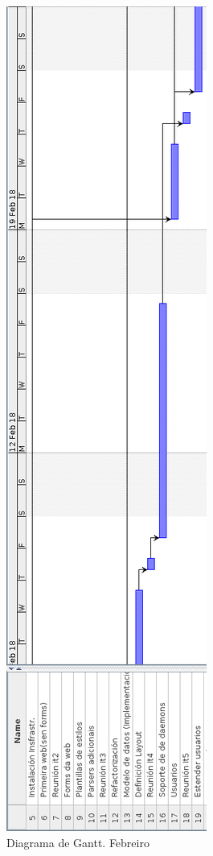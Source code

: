 \begin{figure}[H]
	\centering
	\includegraphics[scale=0.45,keepaspectratio=true]{./images/gantt/g5.png}
	\caption{Diagrama de Gantt. Febreiro}
\end{figure}

